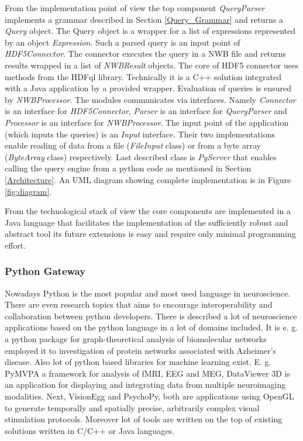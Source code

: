 \documentclass[utf8]{frontiersSCNS} %
\begin{document}
From the implementation point of view the top component \emph{QueryParser} implements a grammar described in Section \ref{Query_Grammar} and returns a \emph{Query} object. The Query object is a wrapper for a list of expressions represented by an object \emph{Expression}. Such a parsed query is an input point of \emph{HDF5Connector}. The connector executes the query in a NWB file and returns results wrapped in a list of \emph{NWBResult} objects. The core of HDF5 connector uses methods from the HDFql library. Technically it is a  C++ solution integrated with a Java application by a provided wrapper. Evaluation of queries is ensured by \emph{NWBProcessor}. The modules communicates via interfaces. Namely \emph{Connector} is an interface for \emph{HDF5Connector}, \emph{Parser} is an interface for \emph{QueryParser} and \emph{Processor} is an interface for \emph{NWBProcessor}. The input point of the application (which inputs the queries) is an  \emph{Input} interface. Their two implementations enable reading of data from a file (\emph{FileInput} class) or from a byte array (\emph{ByteArray} class) respectively. Last described class is \emph{PyServer} that enables calling the query engine from a python code as mentioned in Section \ref{Architecture}. An UML diagram showing complete implementation is in Figure \ref{fig:diagram}.

From the technological stack of view the core components are implemented in a Java language that facilitates the implementation of the sufficiently robust and abstract tool its future extensions is easy and require only minimal programming effort. 

\subsubsection{Python Gateway}
\label{Python_Gateway}

Nowadays Python is the most popular and most used language in neuroscience. There are even research topics \citep{10.3389/fninf.2015.00011} that aims to encourage interoperability and collaboration between python developers. There is described a lot of neuroscience applications based on the python language in a lot of domains included. It is e. g. a python package for graph-theoretical analysis of biomolecular networks employed it to investigation of protein networks associated with Azheimer's disease. Also lot of python based libraries for machine learning exist. E. g. PyMVPA a  framework for analysis of fMRI, EEG and MEG, DataViewer 3D is an application for displaying and integrating data from multiple neuroimaging modalities. Next, VisionEgg and PsychoPy, both are applications using OpenGL to generate temporally and spatially precise, arbitrarily complex visual stimulation protocols.  Moreover lot of tools are written on the top of existing solutions written in C/C++ or Java languages. 
\end{document}
